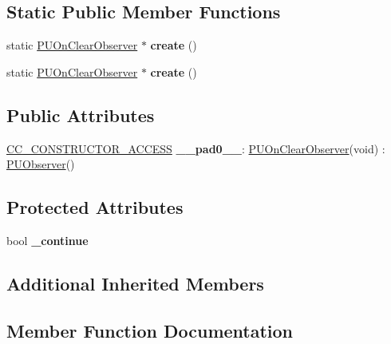 \subsection*{Static Public Member Functions}
\begin{DoxyCompactItemize}
\item 
\mbox{\label{classPUOnClearObserver_a3ab12ca11650c8c9910710b71a5eccff}} 
static \hyperlink{classPUOnClearObserver}{P\+U\+On\+Clear\+Observer} $\ast$ {\bfseries create} ()
\item 
\mbox{\label{classPUOnClearObserver_a5930091ff56d43dcc54cc8d1593ee86e}} 
static \hyperlink{classPUOnClearObserver}{P\+U\+On\+Clear\+Observer} $\ast$ {\bfseries create} ()
\end{DoxyCompactItemize}
\subsection*{Public Attributes}
\begin{DoxyCompactItemize}
\item 
\mbox{\label{classPUOnClearObserver_a23a07a0b61090e535eac6990346c838e}} 
\hyperlink{_2cocos2d_2cocos_2base_2ccConfig_8h_a25ef1314f97c35a2ed3d029b0ead6da0}{C\+C\+\_\+\+C\+O\+N\+S\+T\+R\+U\+C\+T\+O\+R\+\_\+\+A\+C\+C\+E\+SS} {\bfseries \+\_\+\+\_\+pad0\+\_\+\+\_\+}\+: \hyperlink{classPUOnClearObserver}{P\+U\+On\+Clear\+Observer}(void) \+: \hyperlink{classPUObserver}{P\+U\+Observer}()
\end{DoxyCompactItemize}
\subsection*{Protected Attributes}
\begin{DoxyCompactItemize}
\item 
\mbox{\label{classPUOnClearObserver_a35bcacaf0dfa90b7cdfa4d12042ff33b}} 
bool {\bfseries \+\_\+continue}
\end{DoxyCompactItemize}
\subsection*{Additional Inherited Members}


\subsection{Member Function Documentation}
\mbox{\label{classPUOnClearObserver_a63170ff694bf58c730d63145129b0dc0}} 
